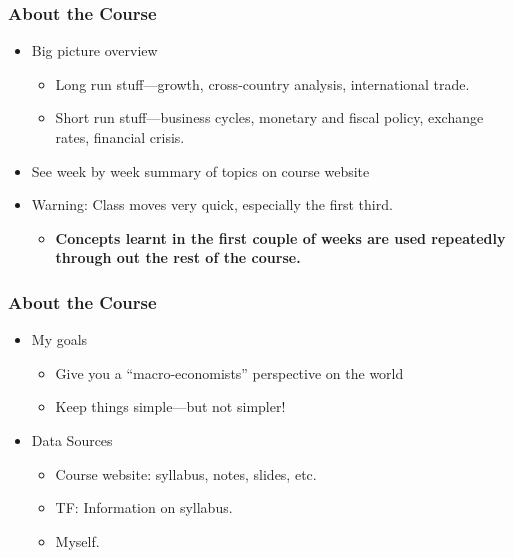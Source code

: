 \documentclass[9pt]{beamer}
\begin{document}

\begin{frame}[t]
\frametitle{About the Course}
\begin{itemize}
\item Big picture overview
\begin{itemize}
\medskip
\item Long run stuff---growth, cross-country analysis, international trade.
\medskip
\item Short run stuff---business cycles, monetary and fiscal policy, exchange rates, financial crisis.
\end{itemize}
\bigskip
\item See week by week summary of topics on course website
\bigskip
\item \begin{alert}{Warning: Class moves very quick, especially the first third.}\end{alert}
\begin{itemize}
\medskip
\item\textbf{Concepts learnt in the first couple of weeks are used repeatedly through out the rest of the course.}
\end{itemize}
\end{itemize}
\end{frame}


\begin{frame}[t]
\frametitle{About the Course}
\begin{itemize}
\item My goals
\begin{itemize}
\medskip
\item Give you a ``macro-economists'' perspective on the world
\medskip
\item Keep things simple---but not simpler!
\end{itemize}
\bigskip
\item Data Sources
\begin{itemize}
\medskip
\item Course website: syllabus, notes, slides, etc.
\medskip
\item TF: Information on syllabus.
\medskip
\item Myself.
\end{itemize}
\end{itemize}
\bigskip
\end{frame}
\end{document}
